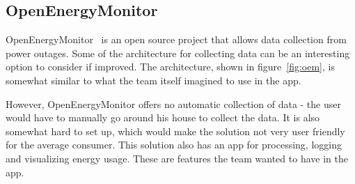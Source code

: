 \begin{figure}[H]
\label{fig:smartly}
  \centering
\quad
\end{figure}
\newpage


\subsection{OpenEnergyMonitor}
\label{sec:openenergymonitor}
OpenEnergyMonitor~\cite{openenergymonitor} is an open source project that allows data collection from power outages. Some of the architecture for collecting data can be an interesting option to consider if improved. The architecture, shown in figure~\ref{fig:oem}, is somewhat similar to what the team itself imagined to use in the app. 

However, OpenEnergyMonitor offers no automatic collection of data - the user would have to manually go around his house to collect the data. It is also somewhat hard to set up, which would make the solution not very user friendly for the average consumer. This solution also has an app for processing, logging and visualizing energy usage. These are features the team wanted to have in the app.


